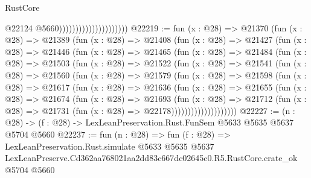 \begin{lexlean}{RustCore}
\begin{coremodule}
                                              @22124
                                              @5660)))))))))))))))))))))
@22219 := fun (x : @28) =>
  @21370
    (fun (x : @28) =>
    @21389
      (fun (x : @28) =>
      @21408
        (fun (x : @28) =>
        @21427
          (fun (x : @28) =>
          @21446
            (fun (x : @28) =>
            @21465
              (fun (x : @28) =>
              @21484
                (fun (x : @28) =>
                @21503
                  (fun (x : @28) =>
                  @21522
                    (fun (x : @28) =>
                    @21541
                      (fun (x : @28) =>
                      @21560
                        (fun (x : @28) =>
                        @21579
                          (fun (x : @28) =>
                          @21598
                            (fun (x : @28) =>
                            @21617
                              (fun (x : @28) =>
                              @21636
                                (fun (x : @28) =>
                                @21655
                                  (fun (x : @28) =>
                                  @21674
                                    (fun (x : @28) =>
                                    @21693
                                      (fun (x : @28) =>
                                      @21712
                                        (fun (x : @28) =>
                                        @21731 (fun (x : @28) => @22178))))))))))))))))))))
@22227 := (n : @28) -> (f : @28) -> LexLeanPreservation.Rust.FunSem @5633 @5635 @5637 @5704 @5660
@22237 := fun (n : @28) =>
  fun (f : @28) =>
  LexLeanPreservation.Rust.simulate
    @5633
    @5635
    @5637
    LexLeanPreserve.Cd362aa768021aa2dd83c667dc02645c0.R5.RustCore.crate_ok
    @5704
    @5660
\end{coremodule}
\end{lexlean}
